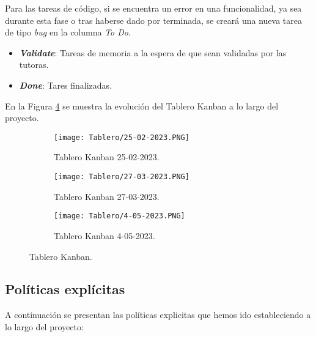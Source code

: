 Para las tareas de código, si se encuentra un error en una funcionalidad, ya sea durante esta fase o tras haberse dado por terminada, se creará una nueva tarea de tipo \textit{bug} en la columna \textit{To Do}.
\begin{itemize}
  \item \textbf{\textit{Validate}}: Tareas de memoria a la espera de que sean validadas por las tutoras.
  \item \textbf{\textit{Done}}: Tares finalizadas.
\end{itemize}
En la Figura \ref{fig:taleros} se muestra la evolución del Tablero Kanban a lo largo del proyecto.
\begin{figure}[ht!]
  \centering
  \begin{subfigure}{\textwidth}
    \centering
    \texttt{[image: Tablero/25-02-2023.PNG]}
    \caption{Tablero Kanban 25-02-2023.}
    \label{fig:tabFeb}
  \end{subfigure}

  \begin{subfigure}{\textwidth}
    \centering
    \texttt{[image: Tablero/27-03-2023.PNG]}
    \caption{Tablero Kanban 27-03-2023.}
    \label{fig:tabmarzo}
  \end{subfigure}

  \begin{subfigure}{\textwidth}
    \centering
    \texttt{[image: Tablero/4-05-2023.PNG]}
    \caption{Tablero Kanban 4-05-2023.}
    \label{fig:tabmayo}
  \end{subfigure}

  \caption{Tablero Kanban.}
  \label{fig:taleros}
\end{figure}

\subsection{Políticas explícitas}
\label{sec:politicas}
A continuación se presentan las políticas explicitas que hemos ido estableciendo a lo largo del proyecto:

